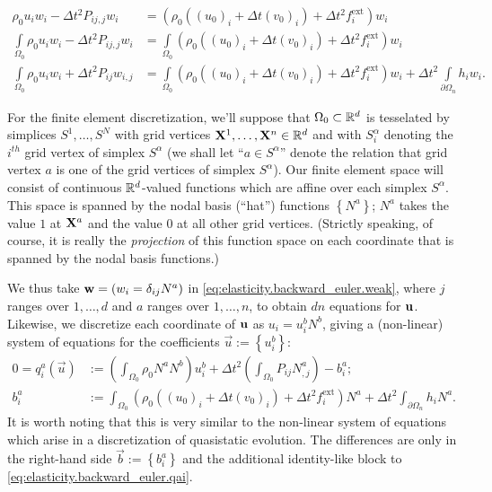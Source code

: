 \begin{subequations}
\begin{align}
\rho_0 u_i w_i - \Delta t^2 P_{ij,j} w_i & = \left( \rho_0 \left( (u_0)_i + \Delta t (v_0)_i \right) + \Delta t^2 f^{\text{ext}}_i \right) w_i \\
\int\limits_{\Omega_0} \!\! \rho_0 u_i w_i - \Delta t^2 P_{ij,j} w_i & = \int\limits_{\Omega_0} \!\! \left( \rho_0 \left( (u_0)_i + \Delta t (v_0)_i \right) + \Delta t^2 f^{\text{ext}}_i \right) w_i \\
\int\limits_{\Omega_0} \!\! \rho_0 u_i w_i + \Delta t^2 P_{ij} w_{i,j} & = \int\limits_{\Omega_0} \!\! \left( \rho_0 \left( (u_0)_i + \Delta t (v_0)_i \right) + \Delta t^2 f^{\text{ext}}_i \right) w_i + \Delta t^2 \!\!\! \int\limits_{\partial \Omega_n} \!\!\! h_i w_i. \label{eq:elasticity.backward_euler.weak}
\end{align}
\end{subequations}

For the finite element discretization, we'll suppose that $\Omega_0 \subset \mathbb{R}^d$ is tesselated by simplices $S^1, \dotsc, S^N$ with grid vertices $\mathbf{X}^1, \dotsc, \mathbf{X}^n \in \mathbb{R}^d$ and with $S^{\alpha}_i$ denoting the $i^{th}$ grid vertex of simplex $S^{\alpha}$ (we shall let ``$a \in S^{\alpha}$'' denote the relation that grid vertex $a$ is one of the grid vertices of simplex $S^{\alpha}$). Our finite element space will consist of continuous $\mathbb{R}^d$-valued functions which are affine over each simplex $S^{\alpha}$. This space is spanned by the nodal basis (``hat'') functions $\left\{ N^a \right\}$; $N^a$ takes the value $1$ at $\mathbf{X}^a$ and the value $0$ at all other grid vertices. (Strictly speaking, of course, it is really the {\em projection} of this function space on each coordinate that is spanned by the nodal basis functions.)

We thus take $\mathbf{w} = \left( w_i = \delta_{ij} N^a \right)$ in \eqref{eq:elasticity.backward_euler.weak}, where $j$ ranges over $1, \dotsc, d$ and $a$ ranges over $1, \dotsc, n$, to obtain $d n$ equations for $\mathbf{u}$. Likewise, we discretize each coordinate of $\mathbf{u}$ as $u_i = u_i^b N^b$, giving a (non-linear) system of equations for the coefficients $\vec{u} := \left\{ u_i^b \right\}$:
\begin{subequations}\label{eq:elasticity.backward_euler.qb}
\begin{align}
0 = q^a_i \left( \vec{u} \right) & := \left( \int_{\Omega_0} \rho_0 N^a N^b \right) u_i^b + \Delta t^2 \left( \int_{\Omega_0} P_{ij} N^a_{,j} \right) - b^a_i; \label{eq:elasticity.backward_euler.qai} \\
b^a_i & := \int_{\Omega_0} \left( \rho_0 \left( (u_0)_i + \Delta t (v_0)_i \right) + \Delta t^2 f^{\text{ext}}_i \right) N^a + \Delta t^2 \int_{\partial \Omega_n} h_i N^a.
\end{align}
\end{subequations}
It is worth noting that this is very similar to the non-linear system of equations which arise in a discretization of quasistatic evolution. The differences are only in the right-hand side $\vec{b} := \left\{ b_i^a \right\}$ and the additional identity-like block to \eqref{eq:elasticity.backward_euler.qai}.

